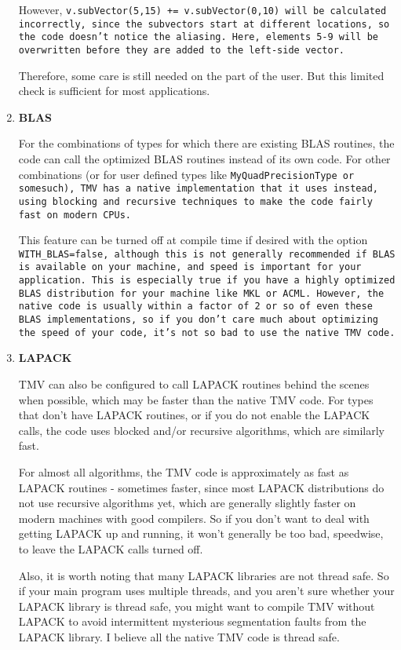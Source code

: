 \begin{enumerate}
However, \tt{v.subVector(5,15) += v.subVector(0,10)} will be calculated 
incorrectly, since the subvectors start at different locations, so the code
doesn't notice the aliasing.  Here, elements 5-9 will be overwritten before
they are added to the left-side vector.

Therefore, some care is still needed on the part of the user.  But this limited check is sufficient
for most applications.

\item
\textbf{BLAS}

For the combinations of types for which there are existing BLAS
routines, the code can call the optimized BLAS routines instead of its own 
code.  For other combinations (or for user defined types like 
\tt{MyQuadPrecisionType} or somesuch), 
TMV has a native implementation that it uses instead, 
using blocking and recursive techniques to make the code fairly fast on modern CPUs.

This feature can be turned off at compile time if desired 
with the option \tt{WITH_BLAS=false},
although this is not generally recommended if 
BLAS is available on your machine, and speed is important for your 
application.  This is especially true if you have a highly optimized BLAS
distribution for your machine like MKL or ACML.  However, 
the native code is usually within a factor of 2 or so of even these BLAS implementations,
so if you don't care much about optimizing the speed of your code, it's not so bad to 
use the native TMV code.
\item
\textbf{LAPACK}

TMV can also be configured to call LAPACK routines behind the scenes when possible, 
which may be faster than the native TMV code.  For types that don't have LAPACK routines, 
or if you do not enable the LAPACK calls,
the code uses blocked and/or recursive algorithms, which are similarly fast.  

For almost all algorithms, 
the TMV code is approximately as fast as LAPACK routines -
sometimes faster, since most
LAPACK distributions do not use recursive algorithms yet, which are generally
slightly faster on modern machines with good compilers. 
So if you don't want to deal with getting LAPACK
up and running, it won't generally be too bad, speedwise, 
to leave the LAPACK calls turned off.

Also, it is worth noting that many LAPACK libraries are not thread safe.
So if your main program uses multiple threads, and you aren't sure whether
your LAPACK library is thread safe, you might want to compile TMV without 
LAPACK to avoid intermittent mysterious segmentation faults from the
LAPACK library.  I believe all the native TMV code is thread safe.


\end{enumerate}
